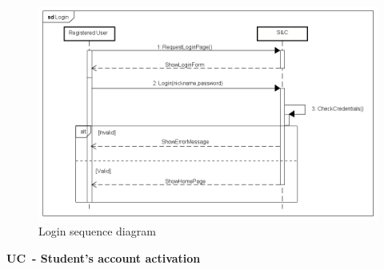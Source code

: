 \begin{figure}[H]
    \centering
    \includegraphics[width=1\linewidth]{Images/Sequence diagrams/Login.png}
    \caption{Login sequence diagram}
    \label{fig:enter-label}
\end{figure}

\textbf{UC\cuc\  - Student's account activation}

